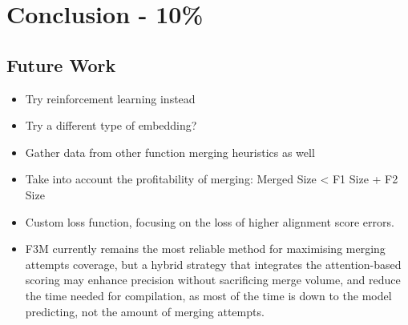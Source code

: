 \chapter{Conclusion - 10\%}


\section{Future Work}

\begin{itemize}
    \item Try reinforcement learning instead
    \item Try a different type of embedding?
    \item Gather data from other function merging heuristics as well
    \item Take into account the profitability of merging: Merged Size < F1 Size + F2 Size
    \item Custom loss function, focusing on the loss of higher alignment score errors.
    \item F3M currently remains the most reliable method for maximising merging attempts coverage, but a hybrid strategy that integrates the attention-based scoring may enhance precision without sacrificing merge volume, and reduce the time needed for compilation, as most of the time is down to the model predicting, not the amount of merging attempts.
\end{itemize}